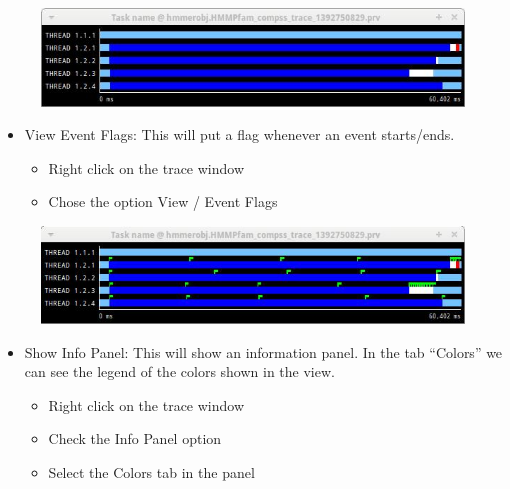 \begin{figure}[ht!]
  \centering
    \includegraphics[width=1.0\textwidth]{./Sections/7_Tracing/Figures/3.jpeg}
\end{figure}

\begin{itemize} 
 \item View Event Flags: This will put a flag whenever an event starts/ends.
\begin{itemize}
 \item Right click on the trace window
 \item Chose the option View / Event Flags
\end{itemize}
\end{itemize}
 
\begin{figure}[ht!]
  \centering
    \includegraphics[width=1.0\textwidth]{./Sections/7_Tracing/Figures/4.jpeg}
\end{figure}

\begin{itemize}
 \item Show Info Panel: This will show an information panel. In the tab ``Colors'' we can see the legend of the colors shown in the view.
 \begin{itemize}
  \item Right click on the trace window
  \item Check the Info Panel option
  \item Select the Colors tab in the panel
 \end{itemize}
\end{itemize}


